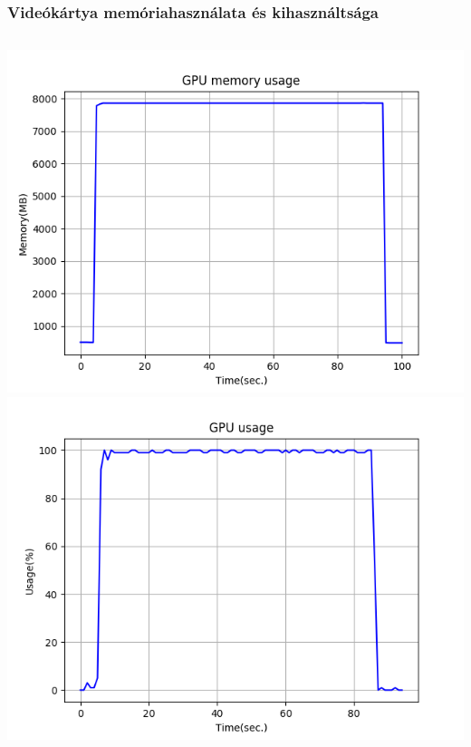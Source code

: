 \documentclass{beamer}
\begin{document}
	\begin{frame}
		\frametitle{Videókártya memóriahasználata és kihasználtsága}
		
		\begin{columns}
			\includegraphics[scale=0.4]{gpu_memory_usage.png}
			\includegraphics[scale=0.4]{gpu_usage.png}
		\end{columns}
	\end{frame}
\end{document}
